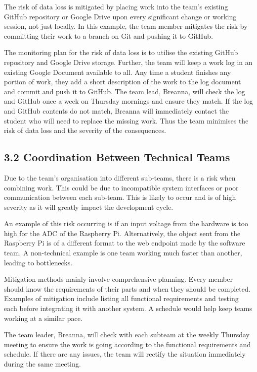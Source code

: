 The risk of data loss is mitigated by placing work into the team’s existing GitHub repository or Google Drive upon every significant change or working session, not just locally. In this example, the team member mitigates the risk by committing their work to a branch on Git and pushing it to GitHub. 

The monitoring plan for the risk of data loss is to utilise the existing GitHub repository and Google Drive storage. Further, the team will keep a work log in an existing Google Document available to all. Any time a student finishes any portion of work, they add a short description of the work to the log document and commit and push it to GitHub. The team lead, Breanna, will check the log and GitHub once a week on Thursday mornings and ensure they match. If the log and GitHub contents do not match, Breanna will immediately contact the student who will need to replace the missing work. Thus the team minimises the risk of data loss and the severity of the consequences.

\subsection*{3.2 Coordination Between Technical Teams}

Due to the team’s organisation into different sub-teams, there is a risk when combining work. This could be due to incompatible system interfaces or poor communication between each sub-team. This is likely to occur and is of high severity as it will greatly impact the development cycle. 

An example of this risk occurring is if an input voltage from the hardware is too high for the ADC of the Raspberry Pi. Alternatively, the object sent from the Raspberry Pi is of a different format to the web endpoint made by the software team. A non-technical example is one team working much faster than another, leading to bottlenecks.

Mitigation methods mainly involve comprehensive planning. Every member should know the requirements of their parts and when they should be completed. Examples of mitigation include listing all functional requirements and testing each before integrating it with another system. A schedule would help keep teams working at a similar pace.

The team leader, Breanna, will check with each subteam at the weekly Thursday meeting to ensure the work is going according to the functional requirements and schedule. If there are any issues, the team will rectify the situation immediately during the same meeting. 


